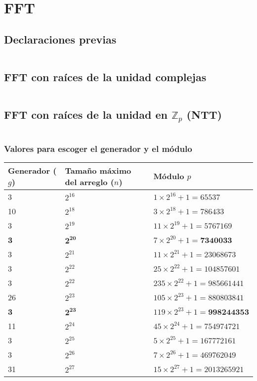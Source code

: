\documentclass[11pt]{article}
\begin{document}
		
	\newpage
	\section{FFT}
		\subsection{Declaraciones previas}
		\inputminted[tabsize=2,breaklines,firstline=3,lastline=11,fontsize=\small]{c++}{fft.cpp}
		
		\subsection{FFT con raíces de la unidad complejas}
		\inputminted[tabsize=2,breaklines,firstline=13,lastline=34,fontsize=\small]{c++}{fft.cpp}
		
		\subsection{FFT con raíces de la unidad en $\mathbb{Z}_p$ (NTT)}
		\inputminted[tabsize=2,breaklines,firstline=36,lastline=73,fontsize=\small]{c++}{fft.cpp}
			\subsubsection{Valores para escoger el generador y el módulo}
				\begin{table}[H]
					\centering
					\begin{tabular}{|p{2.3cm}|p{2.7cm}|p{4.5cm}|}
						\hline
						Generador ($g$) & Tamaño máximo del arreglo ($n$) & Módulo $p$ \\ \hline
						3 & $2^{16}$ & $1 \times 2^{16} + 1 = 65537$ \\ \hline
						10 & $2^{18}$ & $3 \times 2^{18} + 1 = 786433$ \\ \hline
						3 & $2^{19}$ & $11 \times 2^{19} + 1 = 5767169$ \\ \hline
						\textbf{3} & $\mathbf{2^{20}}$ & $7 \times 2^{20} + 1 = \textbf{7340033}$ \\ \hline
						3 & $2^{21}$ & $11 \times 2^{21} + 1 = 23068673$ \\ \hline
						3 & $2^{22}$ & $25 \times 2^{22} + 1 = 104857601$ \\ \hline
						3 & $2^{22}$ & $235 \times 2^{22} + 1 = 985661441$ \\ \hline
						26 & $2^{23}$ & $105 \times 2^{23} + 1 = 880803841$ \\ \hline
						\textbf{3} & $\mathbf{2^{23}}$ & $119 \times 2^{23} + 1 = \textbf{998244353}$ \\ \hline
						11 & $2^{24}$ & $45 \times 2^{24} + 1 = 754974721$ \\ \hline
						3 & $2^{25}$ & $5 \times 2^{25} + 1 = 167772161$ \\ \hline
						3 & $2^{26}$ & $7 \times 2^{26} + 1 = 469762049$ \\ \hline
						31 & $2^{27}$ & $15 \times 2^{27} + 1 = 2013265921$ \\ \hline
					\end{tabular}
				\end{table}
			
\end{document}
